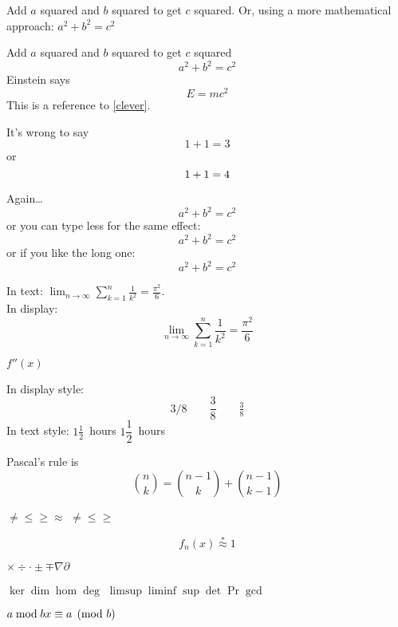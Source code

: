 \documentclass{article}
\begin{document}
	Add $a$ squared and $b$ squared
	to get $c$ squared. Or, using
	a more mathematical approach:
	$a^2 + b^2 = c^2$

	Add $a$ squared and $b$ squared
	to get $c$ squared
	\begin{equation}
	a^2 + b^2 = c^2
	\end{equation}
	Einstein says
	\begin{equation}
	E = mc^2 \label{clever}
	\end{equation}
	This is a reference to
	\eqref{clever}.


	It’s wrong to say
	\begin{equation}
	1 + 1 = 3 \tag{dumb}
	\end{equation}
	or
	\begin{equation}
	1 + 1 = 4 \notag
	\end{equation}


	Again\ldots
	\begin{equation*}
	a^2 + b^2 = c^2
	\end{equation*}
	or you can type less for the
	same effect:
	\[ a^2 + b^2 = c^2 \]
	or if you like the long one:
	\begin{displaymath}
	a^2 + b^2 = c^2
	\end{displaymath}


	In text:
	$\lim_{n \to \infty}\sum_{k=1}^n \frac{1}{k^2}= \frac{\pi^2}{6}$.\\
	In display:
	\[
	\lim_{n \to \infty}
	\sum_{k=1}^n \frac{1}{k^2}
	= \frac{\pi^2}{6}
	\]


	$f''(x)$

	In display style:
	\[
	3/8 \qquad \frac{3}{8}
	\qquad \tfrac{3}{8}
	\]
	In text style:
	$1\frac{1}{2}$~hours \qquad
	$1\dfrac{1}{2}$~hours


	Pascal’s rule is
	\[
	\binom{n}{k} =\binom{n-1}{k}
	+ \binom{n-1}{k-1}
	\]

	$\ne  \le \ge \approx$
	$\neq \leq \geq$

	\[
	f_n(x) \stackrel{*}{\approx} 1
	\]

	$\times \div \cdot \pm \mp \nabla \partial$

	$\ker \dim \hom \deg$
	$\limsup \liminf \sup \det \Pr \gcd$

	$a\bmod b\\x\equiv a\pmod{b}$
\end{document}
